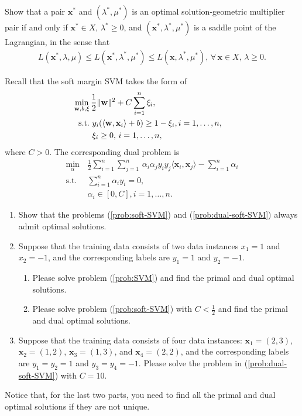 \documentclass[11pt,letter,notitlepage]{article}
\begin{document}
\newpage
\begin{exercise}
	 Show that a pair $\mathbf{x}^*$ and $(\lambda^*,\mu^*)$ is an optimal solution-geometric multiplier pair if and only if $\mathbf{x}^*\in X$, $\lambda^*\geq0$, and $(\mathbf{x}^*,\lambda^*,\mu^*)$ is a saddle point of the Lagrangian, in the sense that
	\begin{align}\label{cond:saddle-Lagrangian}
		L(\mathbf{x}^*,\lambda,\mu)\leq L(\mathbf{x}^*,\lambda^*,\mu^*)\leq L(\mathbf{x},\lambda^*,\mu^*),\,\forall\,\mathbf{x}\in X,\,\lambda\geq0.
	\end{align}
\end{exercise}


\newpage
\begin{exercise}
     Recall that the soft margin SVM takes the form of
\begin{align}\label{prob:soft-SVM}
\min_{\mathbf{w},b,\xi}\,&\frac{1}{2}\|\mathbf{w}\|^2+C\sum_{i=1}^n\xi_i,\\ \nonumber
{\rm s.t.\,}&\,y_i(\langle\mathbf{w},\mathbf{x}_i\rangle+b)\geq1-\xi_i,i=1,\ldots,n,&\\ \nonumber
&\,\xi_i\geq0,\,i=1,\ldots,n,
\end{align}
where $C>0$.
The corresponding dual problem is
\begin{align}\label{prob:dual-soft-SVM}
		\min_{\alpha}\,&\frac{1}{2}\sum_{i=1}^n\sum_{j=1}^n\,\alpha_i\alpha_jy_iy_j\langle\mathbf{x}_i,\mathbf{x}_j\rangle-\sum_{i=1}^n\alpha_i\\\nonumber
	\mbox{s.t. }\,&\sum_{i=1}^n\alpha_iy_i=0,\\\nonumber
	&\alpha_i\in[0,C],i=1,\ldots,n.
\end{align}
\begin{enumerate}
    \item Show that the problems (\ref{prob:soft-SVM}) and (\ref{prob:dual-soft-SVM}) always admit optimal solutions.
    
    \item Suppose that the training data consists of two data instances $x_1=1$ and $x_2=-1$, and the corresponding labels are $y_1=1$ and $y_2=-1$.
    \begin{enumerate}
        \item Please solve problem (\ref{prob:SVM}) and find the primal and dual optimal solutions.
        \item Please solve problem (\ref{prob:soft-SVM}) with $C<\frac{1}{2}$ and find the primal and dual optimal solutions.
    \end{enumerate}

    \item Suppose that the training data consists of four data instances: $\mathbf{x}_1=(2,3)$, $\mathbf{x}_2=(1,2)$, $\mathbf{x}_3=(1,3)$, and $\mathbf{x}_4=(2,2)$, and the corresponding labels are $y_1=y_2=1$ and $y_3=y_4=-1$. Please solve the problem in (\ref{prob:dual-soft-SVM}) with $C=10$.
\end{enumerate}
Notice that, for the last two parts, you need to find all the primal and dual optimal solutions if they are not unique.
\end{exercise}

\end{document}
